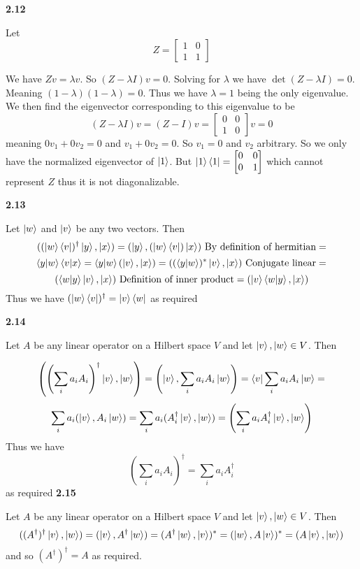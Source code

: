 \textbf{2.12}

Let
\[
Z=
\begin{bmatrix}
    1& 0 \\
    1& 1
\end{bmatrix}\]

We have $ Zv = \lambda v$. So $ (Z-\lambda I)v = 0$. Solving for $\lambda$ we have $ \det(Z-\lambda I) = 0$. Meaning $ (1-\lambda)(1-\lambda) = 0$. Thus we have $\lambda = 1$ being the only eigenvalue. We then find the eigenvector corresponding to this eigenvalue to be
\[(Z-\lambda I)v =(Z- I)v = 
\begin{bmatrix}
    0 & 0 \\
    1 & 0
\end{bmatrix} v = 0\]
meaning $ 0v_1 + 0v_2 = 0$ and $ v_1 +0 v_2 = 0 $. So $v_1 = 0$ and $v_2$ arbitrary. So we only have the normalized eigenvector of $ \ket{1}$. But $ \ket{1}\bra{1}= \begin{bmatrix}
    0 & 0 \\
    0 & 1
\end{bmatrix}$
which cannot represent $ Z$ thus it is not diagonalizable.

\textbf{2.13}

Let $\ket{w}$ and $\ket{v}$ be any two vectors. Then \[ ((\ket{w}\bra{v})^\dag\ket{y},\ket{x})=(\ket{y},(\ket{w}\bra{v})\ket{x}) \text{ By definition of hermitian}=\]
\[\braket{y|w}\braket{v|x} = \braket{y|w}(\ket{v},\ket{x}) = ((\braket{y|w})^*\ket{v},\ket{x}) \text{ Conjugate linear} =\]\[(\braket{w|y}\ket{v},\ket{x}) \text{ Definition of inner product}= (\ket{v}\braket{w|y},\ket{x})\]
Thus we have $ (\ket{w}\bra{v})^\dag =\ket{v}\bra{w}$ as required

\textbf{2.14}

Let $A$ be any linear operator on a Hilbert space $ V$ and let $ \ket{v},\ket{w}\in V$. Then

\[\left(\left(\sum_{i}a_iA_i\right)^\dag\ket{v},\ket{w}\right) =\left(\ket{v},\sum_{i}a_iA_i\ket{w}\right) = \bra{v}\sum_{i}a_iA_i\ket{w} = \]\[\sum_ia_i(\ket{v},A_i\ket{w}) = \sum_ia_i(A_i^\dag\ket{v},\ket{w}) =\left(\sum_ia_iA_i^\dag\ket{v},\ket{w}\right)\]
Thus we have 
\[\left(\sum_{i}a_iA_i\right)^\dag =\sum_ia_iA_i^\dag \]
as required
\newpage
\textbf{2.15}

Let $A$ be any linear operator on a Hilbert space $ V$ and let $ \ket{v},\ket{w}\in V$. Then \[ ((A^\dag)^\dag\ket{v},\ket{w}) = (\ket{v}, A^{\dag}\ket{w}) = (A^{\dag}\ket{w}, \ket{v} )^* = (\ket{w}, A\ket{v})^* = (A\ket{v}, \ket{w})\]
and so $ (A^\dag)^\dag = A$ as required.

